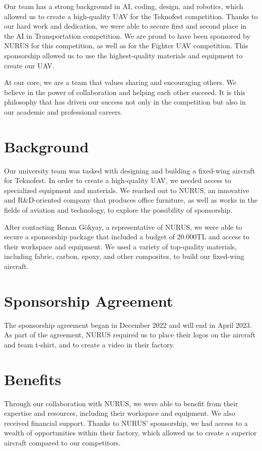 \documentclass{article}
\begin{document}
Our team has a strong background in AI, coding, design, and robotics, which allowed us to create a high-quality UAV for the Teknofest competition. Thanks to our hard work and dedication, we were able to secure first and second place in the AI in Transportation competition. We are proud to have been sponsored by NURUS for this competition, as well as for the Fighter UAV competition. This sponsorship allowed us to use the highest-quality materials and equipment to create our UAV.

At our core, we are a team that values sharing and encouraging others. We believe in the power of collaboration and helping each other succeed. It is this philosophy that has driven our success not only in the competition but also in our academic and professional careers.


\section{Background}

Our university team was tasked with designing and building a fixed-wing aircraft for Teknofest. In order to create a high-quality UAV, we needed access to specialized equipment and materials. We reached out to NURUS, an innovative and R\&D-oriented company that produces office furniture, as well as works in the fields of aviation and technology, to explore the possibility of sponsorship.

After contacting Renan Gökyay, a representative of NURUS, we were able to secure a sponsorship package that included a budget of 20.000TL and access to their workspace and equipment. We used a variety of top-quality materials, including fabric, carbon, epoxy, and other composites, to build our fixed-wing aircraft.

\section{Sponsorship Agreement}

The sponsorship agreement began in December 2022 and will end in April 2023. As part of the agreement, NURUS required us to place their logos on the aircraft and team t-shirt, and to create a video in their factory.

\section{Benefits}

Through our collaboration with NURUS, we were able to benefit from their expertise and resources, including their workspace and equipment. We also received financial support.
Thanks to NURUS' sponsorship, we had access to a wealth of opportunities within their factory, which allowed us to create a superior aircraft compared to our competitors.
\end{document}
